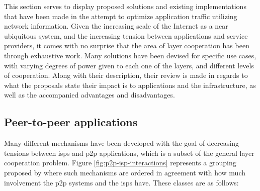     This section serves to display proposed solutions and existing implementations that have been made in the attempt to optimize application traffic utilizing network information.
    Given the increasing scale of the Internet as a near ubiquitous system, and the increasing tension between applications and service providers, it comes with no surprise that the area of layer cooperation has been through exhaustive work.
    Many solutions have been devised for specific use cases, with varying degrees of power given to each one of the layers, and different levels of cooperation.
    Along with their description, their review is made in regards to what the proposals state their impact is to applications and the infrastructure, as well as the accompanied advantages and disadvantages.

\subsection{Peer-to-peer applications}

\label{ssec:approaches-p2p}

    Many different mechanisms have been developed with the goal of decreasing tensions between \glspl{isp} and \gls{p2p} applications, which is a subset of the general layer cooperation problem.
    Figure \ref{fig:p2p-isp-interactions} represents a grouping proposed by \cite{dan-Commag10} where such mechanisms are ordered in agreement with how much involvement the \gls{p2p} systems and the \glspl{isp} have. These classes are as follows:

